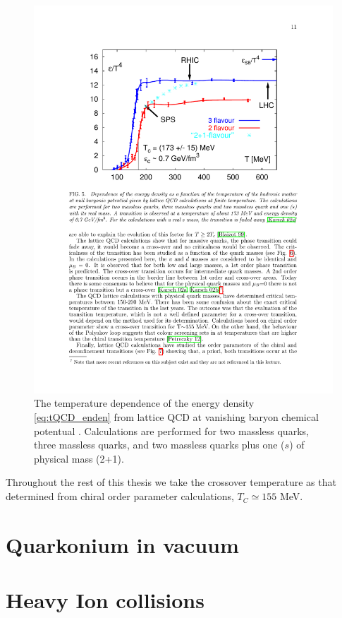 \documentclass[11pt, a4paper, twoside]{book}
\begin{document}
\begin{figure}[t]
	\centering
	\includegraphics[width=\textwidth]{QCD_lat_enden}
	\caption{The temperature dependence of the energy density \eqref{eq:tQCD_enden} from lattice QCD at vanishing baryon chemical potentual \cite{Martinez:2013xka}. Calculations are performed for two massless quarks, three massless quarks, and two massless quarks plus one (\(s\)) of physical mass (2+1).}\label{fig:lattice_en_den}
\end{figure}

Throughout the rest of this thesis we take the crossover temperature as that determined from chiral order parameter calculations, \(T_C\simeq155\) MeV.
\section{Quarkonium in vacuum}
\label{sec:quark_vac}
\onehalfspacing
\section{Heavy Ion collisions}
\label{sec:quark_HIC}
\onehalfspacing
\end{document}
